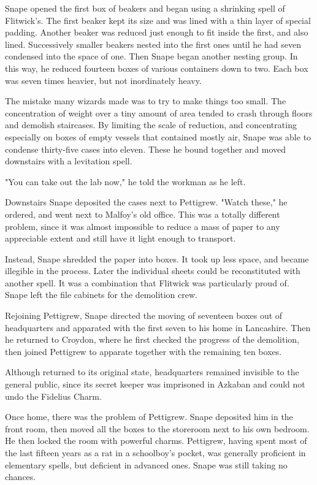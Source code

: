 Snape opened the first box of beakers and began using a shrinking spell of Flitwick's. The first beaker kept its size and was lined with a thin layer of special padding. Another beaker was reduced just enough to fit inside the first, and also lined. Successively smaller beakers nested into the first ones until he had seven condensed into the space of one. Then Snape began another nesting group. In this way, he reduced fourteen boxes of various containers down to two. Each box was seven times heavier, but not inordinately heavy.

The mistake many wizards made was to try to make things too small. The concentration of weight over a tiny amount of area tended to crash through floors and demolish staircases. By limiting the scale of reduction, and concentrating especially on boxes of empty vessels that contained mostly air, Snape was able to condense thirty-five cases into eleven. These he bound together and moved downstairs with a levitation spell.

"You can take out the lab now," he told the workman as he left.

Downstairs Snape deposited the cases next to Pettigrew. "Watch these," he ordered, and went next to Malfoy's old office. This was a totally different problem, since it was almost impossible to reduce a mass of paper to any appreciable extent and still have it light enough to transport.

Instead, Snape shredded the paper into boxes. It took up less space, and became illegible in the process. Later the individual sheets could be reconstituted with another spell. It was a combination that Flitwick was particularly proud of. Snape left the file cabinets for the demolition crew.

Rejoining Pettigrew, Snape directed the moving of seventeen boxes out of headquarters and apparated with the first seven to his home in Lancashire. Then he returned to Croydon, where he first checked the progress of the demolition, then joined Pettigrew to apparate together with the remaining ten boxes.

Although returned to its original state, headquarters remained invisible to the general public, since its secret keeper was imprisoned in Azkaban and could not undo the Fidelius Charm.

Once home, there was the problem of Pettigrew. Snape deposited him in the front room, then moved all the boxes to the storeroom next to his own bedroom. He then locked the room with powerful charms. Pettigrew, having spent most of the last fifteen years as a rat in a schoolboy's pocket, was generally proficient in elementary spells, but deficient in advanced ones. Snape was still taking no chances.

